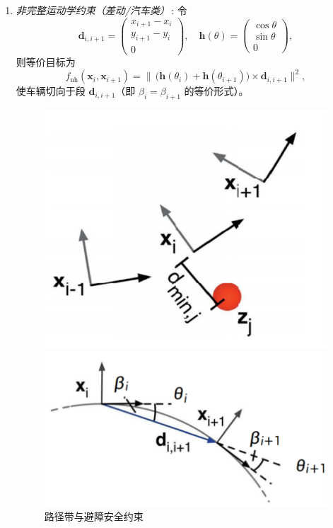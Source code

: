 \documentclass[../main.tex]{subfiles}
\begin{document}
\begin{enumerate}
\begin{itemize}
{\begin{enumerate}
\begin{itemize}
\begin{enumerate}
    \item \emph{非完整运动学约束（差动/汽车类）}\,: 令
    \[
      \mathbf{d}_{i,i+1}=\begin{pmatrix}x_{i+1}-x_i\\[2pt]y_{i+1}-y_i\\[2pt]0\end{pmatrix},\quad
      \mathbf{h}(\theta)=\begin{pmatrix}\cos\theta\\ \sin\theta\\ 0\end{pmatrix},
    \]
    则等价目标为
    \[
      f_{\text{nh}}(\mathbf{x}_i,\mathbf{x}_{i+1})
      =\big\|\,\big(\mathbf{h}(\theta_i)+\mathbf{h}(\theta_{i+1})\big)\times \mathbf{d}_{i,i+1}\big\|^2,
    \]
    使车辆切向于段 $\mathbf{d}_{i,i+1}$（即 $\beta_i=\beta_{i+1}$ 的等价形式）。
    \begin{figure}[H]
    \centering
    \begin{minipage}[t]{0.35\textwidth}
        \centering
        \includegraphics[width=\textwidth]{images/yueshu2.png}
        \caption{路径带与避障安全约束}
    \end{minipage}
    \begin{minipage}[t]{0.35\textwidth}
        \centering
        \includegraphics[width=\textwidth]{images/yueshu3.png}

\end{minipage}
\end{figure}
\end{enumerate}
\end{itemize}
\end{enumerate}}
\end{itemize}
\end{enumerate}
\end{document}
